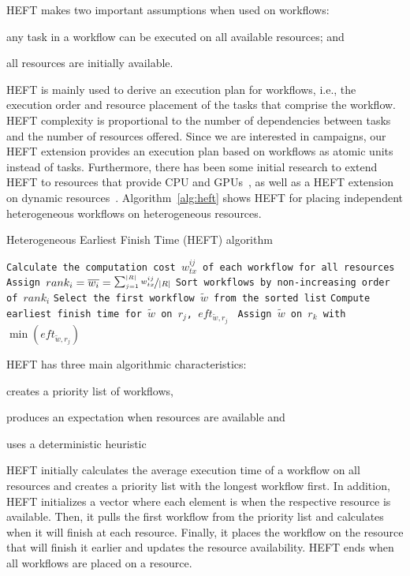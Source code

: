 HEFT makes two important assumptions when used on workflows: 
\begin{inparaenum}[(1)] 
    \item any task in a workflow can be executed on all available resources; and 
    \item all resources are initially available.
\end{inparaenum}
HEFT is mainly used to derive an execution plan for workflows, i.e., the execution order and resource placement of the tasks that comprise the workflow.
HEFT complexity is proportional to the number of dependencies between tasks and the number of resources offered. 
Since we are interested in campaigns, our HEFT extension provides an execution plan based on workflows as atomic units instead of tasks.
Furthermore, there has been some initial research to extend HEFT to resources that provide CPU and GPUs~\cite{shetti2013optimization}, as well as a HEFT extension on dynamic resources~\cite{dong2007pfas}. 
Algorithm~\ref{alg:heft} shows HEFT for placing independent heterogeneous workflows on heterogeneous resources.

\begin{algorithm}[ht]
    \caption{Heterogeneous Earliest Finish Time (HEFT) algorithm}
    \label{alg:heft}
    \begin{algorithmic}[1]
        \State \texttt{Calculate the computation cost $w_{tx}^{ij}$ of each workflow for all resources}
        \State \texttt{Assign $rank_i = \overline{w_{i}} = \nicefrac{\sum_{j=1}^{|R|}w_{tx}^{ij}}{|R|}$}
        \State \texttt{Sort workflows by non-increasing order of $rank_i$}
        \State \texttt{Select the first workflow $\tilde{w}$ from the sorted list}
        \State\texttt{Compute earliest finish time for $\tilde{w}$ on $r_{j}$, $eft_{\tilde{w},r_j}$ }
        \EndFor
        \State \texttt{Assign  $\tilde{w}$ on $r_k$ with $\min{(eft_{\tilde{w},r_j})}$}
        \EndWhile
        \EndProcedure
    \end{algorithmic}
\end{algorithm}

HEFT has three main algorithmic characteristics:
\begin{inparaenum}[1)]
    \item creates a priority list of workflows,
    \item produces an expectation when resources are available and
    \item uses a deterministic heuristic
\end{inparaenum}
HEFT initially calculates the average execution time of a workflow on all resources and creates a priority list with the longest workflow first.
In addition, HEFT initializes a vector where each element is when the respective resource is available.
Then, it pulls the first workflow from the priority list and calculates when it will finish at each resource.
Finally, it places the workflow on the resource that will finish it earlier and updates the resource availability.
HEFT ends when all workflows are placed on a resource.

